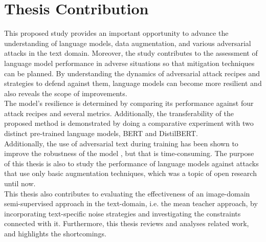 \documentclass[%
	BCOR=8mm, %
	DIV=12,
	toc=bibliography, %
	toc=listof, %
	oneside, %
	egregdoesnotlikesansseriftitles, %
	]{scrbook}
\begin{document}
\section{Thesis Contribution}
This proposed study provides an important opportunity to advance the understanding of language models, data augmentation, and various adversarial attacks in the text domain. Moreover, the study contributes to the assessment of language model performance in adverse situations so that mitigation techniques can be planned. By understanding the dynamics of adversarial attack recipes and strategies to defend against them, language models can become more resilient and also reveals the scope of improvements. \\
The model's resilience is determined by comparing its performance against four attack recipes and several metrics. Additionally, the transferability of the proposed method is demonstrated by doing a comparative experiment with two distinct pre-trained language models, BERT and DistilBERT.\\
Additionally, the use of adversarial text during training has been shown to improve the robustness of the model \cite{li_textbugger_2019}, but that is time-consuming. The purpose of this thesis is also to study the performance of language models against attacks that use only basic augmentation techniques, which was a topic of open research until now.\\
This thesis also contributes to evaluating the effectiveness of an image-domain semi-supervised approach in the text-domain, i.e. the mean teacher approach, by incorporating text-specific noise strategies and investigating the constraints connected with it. Furthermore, this thesis reviews and analyses related work, and highlights the shortcomings.
\end{document}
